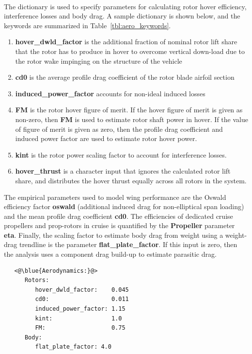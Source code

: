 \paragraph{}
The  dictionary is used to specify parameters for calculating rotor hover efficiency, interference losses and body drag. A sample dictionary is shown below, and the keywords are summarized in Table~\ref{tbl:aero_keywords}. 
\begin{enumerate}
\item \textbf{hover\_dwld\_factor} is the additional fraction of nominal rotor lift share that the rotor has to produce in hover to overcome vertical down-load due to the rotor wake impinging on the structure of the vehicle
\item \textbf{cd0} is the average profile drag coefficient of the rotor blade airfoil section
\item \textbf{induced\_power\_factor} accounts for non-ideal induced losses
\item \textbf{FM} is the rotor hover figure of merit. If the hover figure of merit is given as non-zero, then \textbf{FM} is used to estimate rotor shaft power in hover. If the value of figure of merit is given as zero, then the profile drag coefficient and induced power factor are used to estimate rotor hover power. 
\item \textbf{kint} is the rotor power scaling factor to account for interference losses. 
\item \textbf{hover\_thrust} is a character input that ignores the calculated rotor lift share, and distributes the hover thrust equally across all rotors in the system. %
\end{enumerate}
\noindent The empirical parameters used to model wing performance are the Oswald efficiency factor \textbf{oswald} (additional induced drag for non-elliptical span loading) and the mean profile drag coefficient \textbf{cd0}. The efficiencies of dedicated cruise propellers and prop-rotors in cruise is quantified by the \textbf{Propeller} parameter \textbf{eta}. Finally, the scaling factor to estimate body drag from weight using a weight-drag trendline is the parameter \textbf{flat\_plate\_factor}. If this input is zero, then the analysis uses a component drag build-up to estimate parasitic drag.
\begin{lstlisting}
   <@\blue{Aerodynamics:}@>
      Rotors:
         hover_dwld_factor:    0.045
         cd0:                  0.011
         induced_power_factor: 1.15
         kint:                 1.0
         FM:                   0.75
      Body:
         flat_plate_factor: 4.0
\end{lstlisting}

